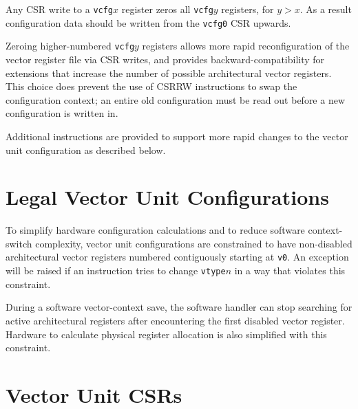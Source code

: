 Any CSR write to a {\tt vcfg}$x$ register zeros all {\tt vcfg}$y$
registers, for $y>x$.  As a result configuration data should be
written from the {\tt vcfg0} CSR upwards.

\begin{commentary}
  Zeroing higher-numbered {\tt vcfg}$y$ registers allows more rapid
  reconfiguration of the vector register file via CSR writes, and
  provides backward-compatibility for extensions that increase the
  number of possible architectural vector registers.  This choice does
  prevent the use of CSRRW instructions to swap the configuration
  context; an entire old configuration must be read out before a new
  configuration is written in.
\end{commentary}

Additional instructions are provided to support more rapid changes to
the vector unit configuration as described below.

\section{Legal Vector Unit Configurations}

To simplify hardware configuration calculations and to reduce software
context-switch complexity, vector unit configurations are constrained
to have non-disabled architectural vector registers numbered
contiguously starting at {\tt v0}.  An exception will be raised if an
instruction tries to change {\tt vtype}$n$ in a way that violates this
constraint.

\begin{commentary}
  During a software vector-context save, the software handler can stop
  searching for active architectural registers after encountering the
  first disabled vector register.  Hardware to calculate physical
  register allocation is also simplified with this constraint.
\end{commentary}

\clearpage

\section{Vector Unit CSRs}

